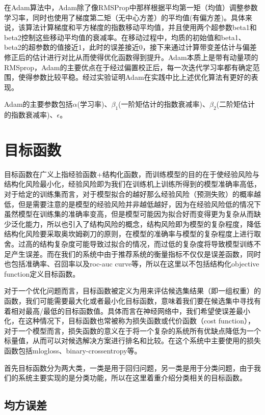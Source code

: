 在Adam算法中，Adam除了像RMSProp中那样根据平均第一矩（均值）调整参数学习率，同时也使用了梯度第二矩（无中心方差）的平均值(有偏方差)。具体来说，该算法计算梯度和平方梯度的指数移动平均值，并且使用两个超参数beta1和beta2控制这些移动平均值的衰减率。在移动过程中，均质的初始值和beta1、beta2的超参数的值接近1，此时的误差接近0，接下来通过计算带变差估计与偏差修正后的估计进行对比从而使得优化函数得到提升。Adam本质上是带有动量项的RMSprop，Adam的主要优点在于经过偏置校正后，每一次迭代学习率都有确定范围，使得参数比较平稳。经过实验证明Adam在实践中比上述优化算法有更好的表现。

Adam的主要参数包括${\alpha}$(学习率)、${\beta}_{1}$(一阶矩估计的指数衰减率)、${\beta}_{2}$(二阶矩估计的指数衰减率)、${\epsilon}$。



\section{目标函数}

目标函数在广义上指经验函数+结构化函数，而训练模型的目的在于使经验风险与结构化风险最小化，经验风险即为我们在训练机上训练所得到的模型准确率高低，对于给定的训练集而言，对于模型拟合的越好那么经验风险（预测失败）的概率越低，但是需要注意的是模型的经验风险并非越低越好，因为在经验风险低的情况下虽然模型在训练集的准确率变高，但是模型可能因为拟合好而变得更为复杂从而缺少泛化能力，所以也引入了结构风险的概念，结构风险即为模型的复杂程度，降低结构化风险要采取奥坎姆剃刀的原则，在模型的准确率与模型的复杂程度上进行取舍。过高的结构复杂度可能导致过拟合的情况，而过低的复杂度将导致模型训练不足产生误差。而在我们的系统中由于推荐系统的衡量指标不仅仅是误差函数，同时也包括准确率、召回率以及roc-auc curve等，所以在这里以不包括结构化objective function定义目标函数。

对于一个优化问题而言，目标函数被定义为用来评估候选集结果（即一组权重）的函数，我们可能需要最大化或者最小化目标函数，意味着我们要在候选集中寻找有着相对最高/最低的目标函数值。具体而言在神经网络中，我们希望使误差最小化，在这种情况下，目标函数也常被称为损失函数或代价函数（cost function），对于一个模型而言，损失函数的意义在于将一个复杂的系统所有优缺点降低为一个标量值，从而可以对候选解决方案进行排名和比较\cite{NeuralSmithing}。在这个系统中主要使用的损失函数包括mlogloss、binary-crossentropy等。

首先目标函数分为两大类，一类是用于回归问题，另一类是用于分类问题，由于我们的系统主要实现的是分类功能，所以在这里着重介绍分类相关的目标函数。

\subsection{均方误差}

